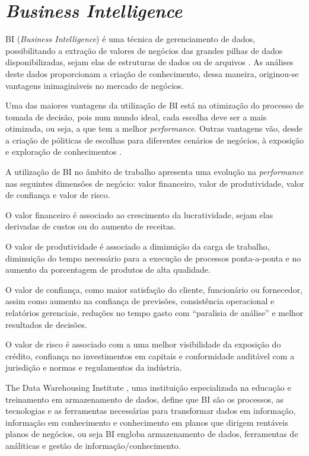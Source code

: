 \section{\textit{Business Intelligence}}
BI (\textit{Business Intelligence}) é uma técnica de gerenciamento de dados, possibilitando a extração de valores de negócios das grandes pilhas de dados disponibilizadas, sejam elas de estruturas de dados ou de arquivos \cite{business_intelligence}. As análises deste dados proporcionam a criação de conhecimento, dessa maneira, originou-se vantagens inimagináveis no mercado de negócios. 

Uma das maiores vantagens da utilização de BI está na otimização do processo de tomada de decisão, pois num mundo ideal, cada escolha deve ser a mais otimizada, ou seja, a que tem a melhor \textit{performance}. Outras vantagens vão, desde a criação de póliticas de escolhas para diferentes cenários de negócios, à exposição e exploração de conhecimentos \cite{business_intelligence}. 

A utilização de BI no âmbito de trabalho apresenta uma evolução na \textit{performance} nas seguintes dimensões de negócio: valor financeiro, valor de produtividade, valor de confiança e valor de risco.

O valor financeiro é associado ao crescimento da lucratividade, sejam elas derivadas de custos ou do aumento de receitas.

O valor de produtividade é associado a diminuição da carga de trabalho, diminuição do tempo necessário para a execução de processos ponta-a-ponta e no aumento da porcentagem de produtos de alta qualidade.

O valor de confiança, como maior satisfação do cliente, funcionário ou fornecedor, assim como aumento na confiança de previsões, consistência operacional e relatórios gerenciais, reduções no tempo gasto com “paralisia de análise” e melhor resultados de decisões.

O valor de risco é associado com a uma melhor visibilidade da exposição do crédito, confiança no investimentos em capitais e conformidade auditável com a jurisdição e normas e regulamentos da indústria.

The Data Warehousing Institute \cite{tdwi}, uma instituição especializada na educação e treinamento em armazenamento de dados, define que BI são os processos, as tecnologias e as ferramentas necessárias para transformar dados em informação, informação em conhecimento e conhecimento em planos que dirigem rentáveis planos de negócios, ou seja BI engloba armazenamento de dados, ferramentas de análiticas e gestão de informação/conhecimento. 

